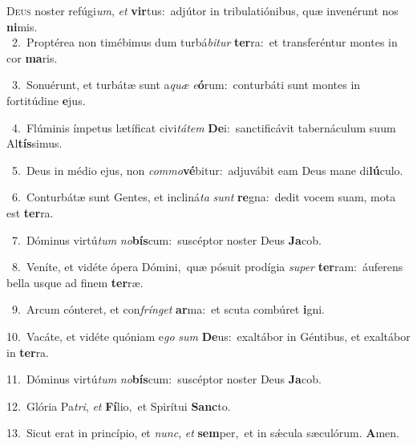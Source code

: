 \lettrine{\initial\textcolor{\initialcolor}{D}}{eus} noster refúgi\-\textit{um}\-, \textit{et} \textbf{vir}\-tus:~\star adjútor in tribulatiónibus, quæ invenérunt nos \textbf{ni}\-mis.\\
{\numbfont\textcolor{\numbcolor}{~2.}}~Proptérea non timébimus dum turbá\-\textit{bi}\-\textit{tur} \textbf{ter}\-ra:~\star et transferéntur montes in cor \textbf{ma}\-ris.\par
{\numbfont\textcolor{\numbcolor}{~3.}}~Sonuérunt, et turbátæ sunt a\textit{quæ} \textit{e}\-\textbf{ó}rum:~\star conturbáti sunt montes in fortitúdine \textbf{e}\-jus.\par
{\numbfont\textcolor{\numbcolor}{~4.}}~Flúminis ímpetus lætíficat civi\-\textit{tá}\-\textit{tem} \textbf{De}\-i:~\star sanctificávit tabernáculum suum Al\-\textbf{tís}\-simus.\par
{\numbfont\textcolor{\numbcolor}{~5.}}~Deus in médio ejus, non \textit{com}\-\textit{mo}\textbf{vé}bitur:~\star adjuvábit eam Deus mane di\-\textbf{lú}\-culo.\par
{\numbfont\textcolor{\numbcolor}{~6.}}~Conturbátæ sunt Gentes, et incliná\textit{ta} \textit{sunt} \textbf{re}\-gna:~\star dedit vocem suam, mota est \textbf{ter}\-ra.\par
{\numbfont\textcolor{\numbcolor}{~7.}}~Dóminus virtú\textit{tum} \textit{no}\-\textbf{bís}cum:~\star suscéptor noster Deus \textbf{Ja}\-cob.\par
{\numbfont\textcolor{\numbcolor}{~8.}}~Veníte, et vidéte ópera Dómini,~\dagger quæ pósuit prodígia \textit{su}\-\textit{per} \textbf{ter}\-ram:~\star áuferens bella usque ad finem \textbf{ter}\-ræ.\par
{\numbfont\textcolor{\numbcolor}{~9.}}~Arcum cónteret, et con\-\textit{frín}\-\textit{get} \textbf{ar}\-ma:~\star et scuta combúret \textbf{i}\-gni.\par
{\numbfont\textcolor{\numbcolor}{10.}}~Vacáte, et vidéte quóniam e\textit{go} \textit{sum} \textbf{De}\-us:~\star exaltábor in Géntibus, et exaltábor in \textbf{ter}\-ra.\par
{\numbfont\textcolor{\numbcolor}{11.}}~Dóminus virtú\textit{tum} \textit{no}\-\textbf{bís}cum:~\star suscéptor noster Deus \textbf{Ja}\-cob.\par
{\numbfont\textcolor{\numbcolor}{12.}}~Glória Pa\-\textit{tri}\-, \textit{et} \textbf{Fí}\-lio,~\star et Spirítui \textbf{Sanc}\-to.\par
{\numbfont\textcolor{\numbcolor}{13.}}~Sicut erat in princípio, et \textit{nunc}\-, \textit{et} \textbf{sem}\-per,~\star et in sǽcula sæculórum. \textbf{A}\-men.\par
